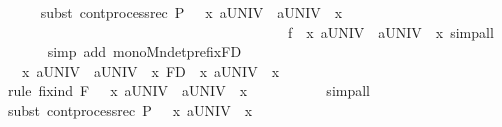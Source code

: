 \begin{isabellebody}
\ \ \ \ \isamarkupfalse%
{\isacharparenleft}{\kern0pt}subst\ cont{\isacharunderscore}{\kern0pt}process{\isacharunderscore}{\kern0pt}rec{\isacharbrackleft}{\kern0pt}\ P\ {\isacharequal}{\kern0pt}\ {\isacartoucheopen}{\isacharparenleft}{\kern0pt}{\isasymmu}\ x{\isachardot}{\kern0pt}\ {\isasymsqinter}a{\isasymin}UNIV\ {\isasymrightarrow}\ {\isasymsqinter}a{\isasymin}UNIV\ {\isasymrightarrow}\ x{\isacharparenright}{\kern0pt}{\isacartoucheclose}\ \isanewline
\ \ \ \ \ \ \ \ \ \ \ \ \ \ \ \ \ \ \ \ \ \ \ \ \ \ \ \ \ \ \ \ \ \ \ \ \ \ \ \ f\ {\isacharequal}{\kern0pt}\ {\isacartoucheopen}{\isasymlambda}x{\isachardot}{\kern0pt}\ {\isasymsqinter}a{\isasymin}UNIV\ {\isasymrightarrow}\ {\isasymsqinter}a{\isasymin}UNIV\ {\isasymrightarrow}\ x{\isacartoucheclose}{\isacharbrackright}{\kern0pt}{\isacharcomma}{\kern0pt}\ simp{\isacharunderscore}{\kern0pt}all{\isacharparenright}{\kern0pt}\isanewline
\ \ \ \ \isamarkupfalse%
\ {\isacharparenleft}{\kern0pt}simp\ add{\isacharcolon}{\kern0pt}\ mono{\isacharunderscore}{\kern0pt}Mndetprefix{\isacharunderscore}{\kern0pt}FD{\isacharparenright}{\kern0pt}\isanewline
{}\isamarkupfalse%
\ \isanewline
\ \ \isamarkupfalse%
\ {\isacartoucheopen}{\isacharparenleft}{\kern0pt}{\isasymmu}\ x{\isachardot}{\kern0pt}\ {\isasymsqinter}a{\isasymin}UNIV\ {\isasymrightarrow}\ {\isasymsqinter}a{\isasymin}UNIV\ {\isasymrightarrow}\ x{\isacharparenright}{\kern0pt}\ {\isasymsqsubseteq}\isactrlsub F\isactrlsub D\ {\isacharparenleft}{\kern0pt}{\isasymmu}\ x{\isachardot}{\kern0pt}\ {\isasymsqinter}a{\isasymin}UNIV\ {\isasymrightarrow}\ x{\isacharparenright}{\kern0pt}{\isacartoucheclose}\ \isanewline
\ \ \ \ \isamarkupfalse%
{\isacharparenleft}{\kern0pt}rule\ fix{\isacharunderscore}{\kern0pt}ind{\isacharbrackleft}{\kern0pt}\ F\ {\isacharequal}{\kern0pt}\ {\isacartoucheopen}{\isacharparenleft}{\kern0pt}{\isasymLambda}\ x{\isachardot}{\kern0pt}\ {\isasymsqinter}a{\isasymin}UNIV\ {\isasymrightarrow}\ {\isasymsqinter}a{\isasymin}UNIV\ {\isasymrightarrow}\ x{\isacharparenright}{\kern0pt}{\isacartoucheclose}{\isacharbrackright}{\kern0pt}\ {\isacharparenright}{\kern0pt}\ \ \isanewline
\ \ \ \ \ \ \isamarkupfalse%
\ {\isacharparenleft}{\kern0pt}simp{\isacharunderscore}{\kern0pt}all{\isacharparenright}{\kern0pt}\isanewline
\ \ \ \ \isamarkupfalse%
{\isacharparenleft}{\kern0pt}subst\ cont{\isacharunderscore}{\kern0pt}process{\isacharunderscore}{\kern0pt}rec{\isacharbrackleft}{\kern0pt}\ P\ {\isacharequal}{\kern0pt}\ {\isacartoucheopen}{\isacharparenleft}{\kern0pt}{\isasymmu}\ x{\isachardot}{\kern0pt}\ {\isasymsqinter}a{\isasymin}UNIV\ {\isasymrightarrow}\ x{\isacharparenright}{\kern0pt}{\isacartoucheclose}\ \isanewline

\end{isabellebody}
